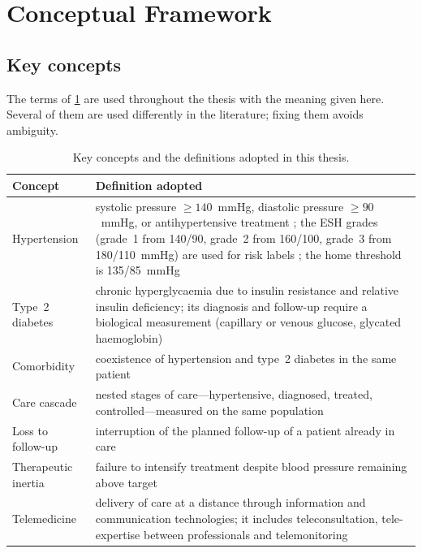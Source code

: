 \section{Conceptual Framework}\label{sec:concepts}

\subsection{Key concepts}\label{sec:definitions}

The terms of \cref{tab:concepts} are used throughout the thesis with the meaning given here. Several of them are used differently in the literature; fixing them avoids ambiguity.

\begin{table}[htbp]
\centering\footnotesize
\caption{Key concepts and the definitions adopted in this thesis.}\label{tab:concepts}
\begin{tabularx}{\textwidth}{@{}>{\raggedright\arraybackslash}p{3.3cm} X@{}}
\toprule
\textbf{Concept} & \textbf{Definition adopted} \\
\midrule
Hypertension & systolic pressure $\geq 140$~mmHg, diastolic pressure $\geq 90$~mmHg, or antihypertensive treatment \parencite{who2023hypertension}; the ESH grades (grade~1 from 140/90, grade~2 from 160/100, grade~3 from 180/110~mmHg) are used for risk labels \parencite{mancia2023}; the home threshold is 135/85~mmHg \parencite{mancia2023} \\
Type~2 diabetes & chronic hyperglycaemia due to insulin resistance and relative insulin deficiency; its diagnosis and follow-up require a biological measurement (capillary or venous glucose, glycated haemoglobin) \\
Comorbidity & coexistence of hypertension and type~2 diabetes in the same patient \\
Care cascade & nested stages of care---hypertensive, diagnosed, treated, controlled---measured on the same population \parencite{who2023hypertension} \\
Loss to follow-up & interruption of the planned follow-up of a patient already in care \\
Therapeutic inertia & failure to intensify treatment despite blood pressure remaining above target \\
Telemedicine & delivery of care at a distance through information and communication technologies; it includes teleconsultation, tele-expertise between professionals and telemonitoring \\

\end{tabularx}
\end{table}
